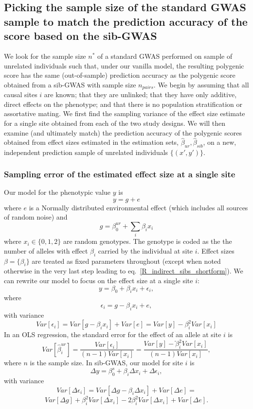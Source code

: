 \documentclass[hidelinks, 12pt]{article}
\begin{document}
\pagebreak

\subsection{Picking the sample size of the standard GWAS sample to match the prediction accuracy of the score based on the sib-GWAS}
\label{matching_errors_under_the_null}

We look for the sample size $n^*$ of a standard GWAS performed on sample of unrelated individuals such that, under our vanilla model, the resulting polygenic score has the same (out-of-sample) prediction accuracy as the polygenic score obtained from a sib-GWAS with sample size $n_{pairs}$.  We begin by assuming that all causal sites $i$ are known; that they are unlinked; that they have only additive, direct effects on the phenotype; and that there is no population stratification or assortative mating.  We first find the sampling variance of the effect size estimate for a single site obtained from each of the two study designs.  We will then examine (and ultimately match) the prediction accuracy of the polygenic scores obtained from effect sizes estimated in the estimation sets, $\hat{\beta}_{ur},\hat{\beta}_{sib}$, on a new, independent prediction sample of unrelated individuals $\{(x',y')\}$.

\subsubsection{Sampling error of the estimated effect size at a single site}
Our model for the phenotypic value $y$ is
$$y=g+e$$
where $e$ is a Normally distributed environmental effect (which includes all sources of random noise) and
$$g=\beta^{ur}_0+\sum_{i}\beta_ix_i$$ 
where $x_i \in \{0,1,2\}$ are random genotypes.  The genotype is coded as the the number of alleles with effect $\beta_i$ carried by the individual at site $i$.  Effect sizes $\beta=\{\beta_i\}$ are treated as fixed parameters throughout (except when noted otherwise in the very last step leading to eq.~\ref{R_indirect_sibs_shortform}).  We can rewrite our model to focus on the effect size at a single site $i$:
\begin{equation}
\label{ols_model}
y=\beta_0+\beta_ix_i+\epsilon_i,
\end{equation}
where 
$$\epsilon_i=g-\beta_i x_i+e,$$
with variance
$$Var[\epsilon_i]=Var[g-\beta_i x_i]+Var[e] = Var[y]-\beta_i^2Var[x_i]$$
In an OLS regression, the standard error for the effect of an allele at site $i$ is
\begin{equation}
\label{var_beta_hat_ur}
Var[\hat{\beta}^{ur}_i]=\frac{Var[\epsilon_i]}{(n-1) Var[x_i]} = \frac{Var[y]-ֿ\beta_i^2Var[x_i]}{(n-1)Var[x_i]},
\end{equation}
where $n$ is the sample size.  In sib-GWAS, our model for site $i$ is
$$\Delta y=\beta^{s}_0+\beta_i \Delta x_i+\Delta \epsilon_i,$$
with variance
$$Var[\Delta \epsilon_i] = Var[\Delta g-\beta_i \Delta x_i] + Var[\Delta e] =$$
$$Var[\Delta g]+\beta_i^2Var[\Delta x_i]-2\beta_i^2 Var[\Delta x_i]+ Var[\Delta e].$$
\end{document}
